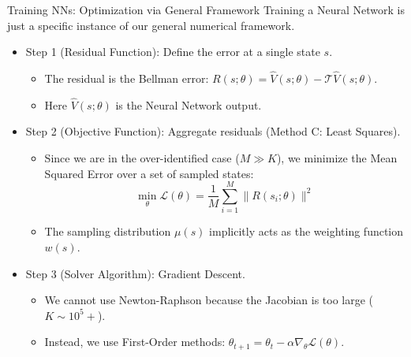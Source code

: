 \documentclass[aspectratio=169]{beamer}
\newcommand{\1}{\mathbf{1}}
\begin{document}
\begin{frame}{Training NNs: Optimization via General Framework}
    \small
    \vspace{0.3mm}
    Training a Neural Network is just a specific instance of our general numerical framework.
    \begin{itemize}
        \item Step 1 (Residual Function): Define the error at a single state $s$.
        \begin{itemize}
            \item The residual is the Bellman error: $R(s; \theta) = \hat{V}(s; \theta) - \mathcal{T}\hat{V}(s; \theta)$.
            \item Here $\hat{V}(s; \theta)$ is the Neural Network output.
        \end{itemize}
        
        \item Step 2 (Objective Function): Aggregate residuals (Method C: Least Squares).
        \begin{itemize}
            \item Since we are in the over-identified case ($M \gg K$), we minimize the Mean Squared Error over a set of sampled states:
            $$ \min_{\theta} \mathcal{L}(\theta) = \frac{1}{M} \sum_{i=1}^M \| R(s_i; \theta) \|^2 $$
            \item The sampling distribution $\mu(s)$ implicitly acts as the weighting function $w(s)$.
        \end{itemize}

        \item Step 3 (Solver Algorithm): Gradient Descent.
        \begin{itemize}
            \item We cannot use Newton-Raphson because the Jacobian is too large ($K \sim 10^5+$).
            \item Instead, we use First-Order methods: $\theta_{t+1} = \theta_t - \alpha \nabla_\theta \mathcal{L}(\theta)$.
        \end{itemize}
    \end{itemize}
\end{frame}
\end{document}
